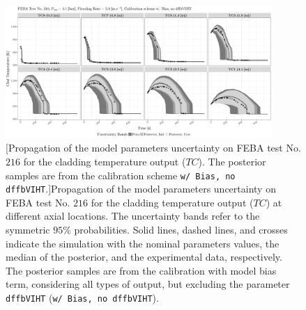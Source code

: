 \clearpage
\begin{figure}
	\centering
	\includegraphics[width=0.90\textwidth]{../figures/chapter5/figures/plotTraceUQPosteriorAllDiscCenteredNoParam8TC216}
		[Propagation of the model parameters uncertainty on FEBA test No. $216$ for the cladding temperature output ($TC$). The posterior samples are from the calibration scheme \texttt{w/ Bias, no dffbVIHT}.]{Propagation of the model parameters uncertainty on FEBA test No. $216$ for the cladding temperature output ($TC$) at different axial locations. The uncertainty bands refer to the symmetric $95\%$ probabilities. Solid lines, dashed lines, and crosses indicate the simulation with the nominal parameters values, the median of the posterior, and the experimental data, respectively. The posterior samples are from the calibration with model bias term, considering all types of output, but excluding the parameter \texttt{dffbVIHT} (\texttt{w/ Bias, no dffbVIHT}).}
	\label{fig:ch5_plot_trace_uq_post_tc_216_noparam8}
\end{figure}
\clearpage

